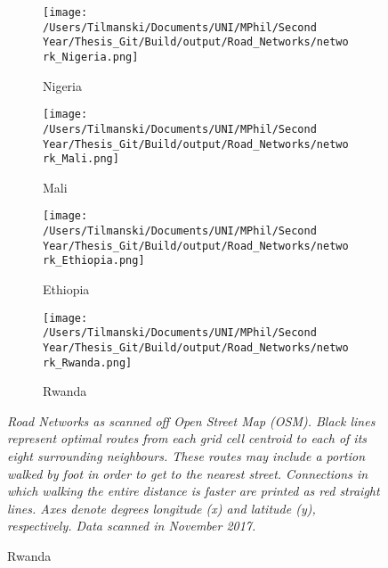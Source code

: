 \documentclass[11pt, oneside]{article}   	%
\newcommand{\mysubcaption}[1]{
\justify
\begin{spacing}{0.7}
\textit{\footnotesize #1}
\end{spacing}}
\begin{document}
\begin{figure}[t]
\centering
\caption{Road Networks for Different Countries as Scanned off OSM}

\begin{subfigure}[c]{0.43\textwidth}
\texttt{[image: /Users/Tilmanski/Documents/UNI/MPhil/Second Year/Thesis\_Git/Build/output/Road\_Networks/network\_Nigeria.png]}
\caption{Nigeria}
\label{fig:nigeria_roads}
\end{subfigure}
\begin{subfigure}[c]{0.43\textwidth}
\texttt{[image: /Users/Tilmanski/Documents/UNI/MPhil/Second Year/Thesis\_Git/Build/output/Road\_Networks/network\_Mali.png]}
\caption{Mali}
\label{fig:Mali_roads}
\end{subfigure}

\begin{subfigure}[c]{0.43\textwidth}
\texttt{[image: /Users/Tilmanski/Documents/UNI/MPhil/Second Year/Thesis\_Git/Build/output/Road\_Networks/network\_Ethiopia.png]}
\caption{Ethiopia}
\label{fig:Ethiopia_roads}
\end{subfigure}
\begin{subfigure}[c]{0.43\textwidth}
\texttt{[image: /Users/Tilmanski/Documents/UNI/MPhil/Second Year/Thesis\_Git/Build/output/Road\_Networks/network\_Rwanda.png]}
\caption{Rwanda}
\label{fig:Rwanda_roads}
\end{subfigure}
\mysubcaption{Road Networks as scanned off Open Street Map (OSM). Black lines represent optimal routes from each grid cell centroid to each of its eight surrounding neighbours. These routes may include a portion walked by foot in order to get to the nearest street. Connections in which walking the entire distance is faster are printed as red straight lines. Axes denote degrees longitude (x) and latitude (y), respectively. Data scanned in November 2017.}

\label{fig:roads}
\end{figure}
\end{document}
